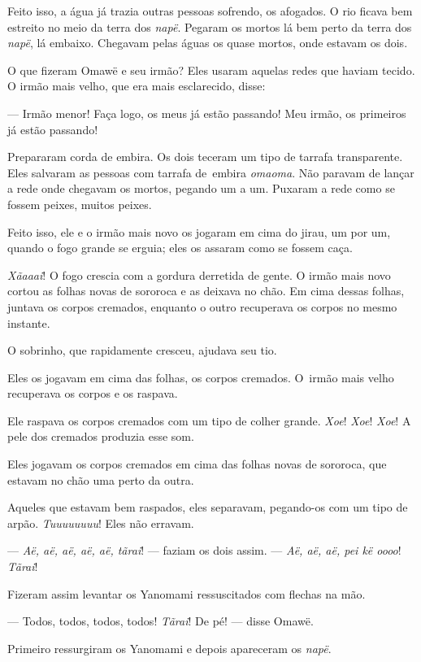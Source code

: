 Feito isso, a água já trazia outras pessoas sofrendo, os afogados. O rio ficava bem estreito no meio da terra dos \textit{napë}. Pegaram os
mortos lá bem perto da terra dos \textit{napë}, lá embaixo. Chegavam
pelas águas os quase mortos, onde estavam os dois. 

O que fizeram Omawë e seu irmão? Eles usaram aquelas redes que haviam
 tecido. O irmão mais velho, que era mais esclarecido, disse: 

--- Irmão menor! Faça logo, os meus já estão passando! Meu irmão, os
primeiros já estão passando! 

Prepararam corda de embira. Os dois teceram um tipo de tarrafa transparente.
 Eles salvaram as pessoas com tarrafa de~embira \textit{omaoma}. Não paravam de
 lançar a rede onde chegavam os mortos, pegando um a um. Puxaram a rede
 como se fossem peixes, muitos peixes.

Feito isso, ele e o irmão mais novo os jogaram em cima do jirau, um por
um, quando o fogo grande se erguia; eles os assaram como se fossem
caça. 

\textit{Xãaaai}! O fogo crescia com a gordura derretida de gente. O irmão
mais novo cortou as folhas novas de sororoca e as deixava no chão. Em
cima dessas folhas, juntava os corpos cremados, enquanto o outro
recuperava os corpos no mesmo instante. 

O sobrinho, que rapidamente cresceu, ajudava seu tio. 

Eles os jogavam em cima das folhas, os corpos cremados. O~irmão mais
velho recuperava os corpos e os raspava. 

Ele raspava os corpos cremados com um tipo de colher grande. \textit{Xoe}! \textit{Xoe}! \textit{Xoe}! A pele dos cremados produzia esse som. 

Eles jogavam os corpos cremados em cima das folhas novas de sororoca,
que estavam no chão uma perto da outra. 

Aqueles que estavam bem raspados, eles separavam, pegando-os com um
 tipo de arpão. \textit{Tuuuuuuuu}! Eles não erravam. 

--- \textit{Aë, aë, aë, aë, aë, tãrai}! --- faziam os dois assim. --- \textit{Aë, aë, aë,
pei kë oooo}! \textit{Tãrai}! 

Fizeram assim levantar os Yanomami ressuscitados com flechas na mão. 

--- Todos, todos, todos, todos! \textit{Tãrai}! De pé! --- disse Omawë.

Primeiro ressurgiram os Yanomami e depois apareceram os \textit{napë}. 

